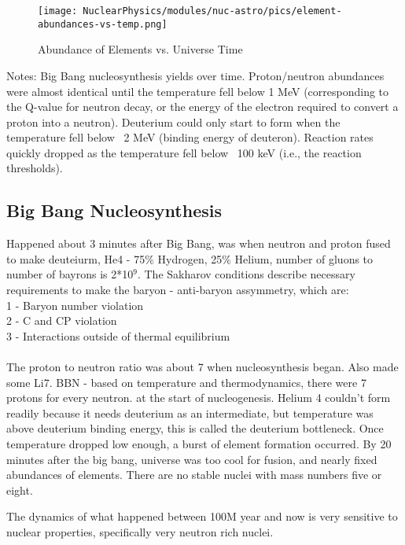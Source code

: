             
                  
            \begin{figure}[H]
                \centering
                \texttt{[image: NuclearPhysics/modules/nuc-astro/pics/element-abundances-vs-temp.png]}
            \caption{Abundance of Elements vs. Universe Time}
            \end{figure}
            
            Notes: Big Bang nucleosynthesis yields over time. Proton/neutron abundances were almost identical until the temperature fell below 1 MeV (corresponding to the Q-value for neutron decay, or the energy of the electron required to convert a proton into a neutron). Deuterium could only start to form when the temperature fell below ~2 MeV (binding energy of deuteron). Reaction rates quickly dropped as the temperature fell below ~100 keV (i.e., the reaction thresholds).
            
        \subsection{Big Bang Nucleosynthesis}
            Happened about 3 minutes after Big Bang, was when neutron and proton fused to make deuteiurm, He4 - 75\% Hydrogen, 25\% Helium, number of gluons to number of bayrons is 2*10$^9$. The Sakharov conditions describe necessary requirements to make the baryon - anti-baryon assymmetry, which are:\\
            1 - Baryon number violation\\
            2 - C and CP violation \\
            3 - Interactions outside of thermal equilibrium\\
            \\
            The proton to neutron ratio was about 7 when nucleosynthesis began. Also made some Li7. BBN - based on temperature and thermodynamics, there were 7 protons for every neutron. at the start of nucleogenesis. Helium 4 couldn't form readily because it needs deuterium as an intermediate, but temperature was above deuterium binding energy, this is called the deuterium bottleneck. Once temperature dropped low enough, a burst of element formation occurred. By 20 minutes after the big bang, universe was too cool for fusion, and nearly fixed abundances of elements. There are no stable nuclei with mass numbers five or eight. 
        
        
            The dynamics of what happened between 100M year and now is very sensitive to nuclear properties, specifically very neutron rich nuclei.
    
